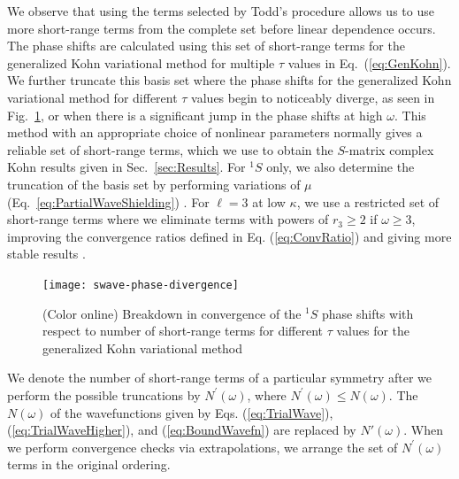 \documentclass[preprint,showpacs,showkeys,preprintnumbers,amsmath,amssymb,longbibliography,pra,aps]{revtex4-1}
\begin{document}
We observe that using the terms selected by Todd's procedure allows us to
use more short-range terms from the complete set before linear dependence occurs.
The phase shifts are calculated using this set of short-range terms for the 
generalized Kohn variational method for multiple $\tau$ values in
Eq.~(\ref{eq:GenKohn}). We further truncate this basis set where the phase
shifts for the generalized Kohn variational method
for different $\tau$ values begin to noticeably diverge, as seen in
Fig.~\ref{fig:swave-phase-divergence}, or when there is a significant jump in
the phase shifts at high $\omega$. This method with an appropriate choice of
nonlinear parameters normally gives a reliable set of
short-range terms, which we use to obtain the $S$-matrix complex Kohn
results given in Sec.~\ref{sec:Results}. For $^1S$ only, we also determine
the truncation of the basis set by performing variations of $\mu$
(Eq.~\ref{eq:PartialWaveShielding}) \cite{WoodsDiss2015}.
For $\ell = 3$ at low $\kappa$, we use a restricted set of short-range terms
where we eliminate terms with powers of $r_3 \geq 2$ if $\omega \geq 3$,
improving the convergence ratios defined in Eq. (\ref{eq:ConvRatio})
and giving more stable results
\cite{VanReeth2003,WoodsDiss2015}.
\begin{figure}[H]
	\centering
	\texttt{[image: swave-phase-divergence]}
	\caption{(Color online) Breakdown in convergence of the $^1S$ phase
shifts with respect to number of short-range terms for different $\tau$
values for the generalized Kohn variational method}
	\label{fig:swave-phase-divergence}
\end{figure}

We denote the number of short-range terms of a particular symmetry after
we perform the possible truncations by $N^\prime(\omega)$,
where $N^\prime(\omega) \leq N(\omega)$.
The $N(\omega)$ of the wavefunctions given by Eqs. (\ref{eq:TrialWave}),
(\ref{eq:TrialWaveHigher}), and (\ref{eq:BoundWavefn}) are replaced by
$N'(\omega)$.
When we perform convergence checks via extrapolations,
we arrange the set of $N^\prime(\omega)$ terms in the original ordering.
\end{document}

